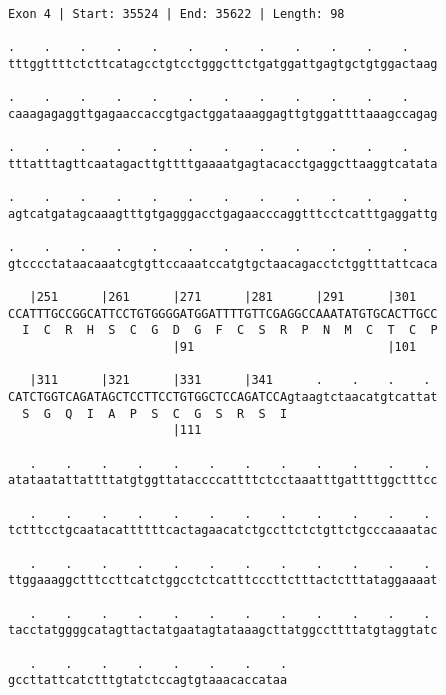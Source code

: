 \documentclass{article}
\begin{document}
\begin{Verbatim}
Exon 4 | Start: 35524 | End: 35622 | Length: 98
 
.    .    .    .    .    .    .    .    .    .    .    .    
tttggttttctcttcatagcctgtcctgggcttctgatggattgagtgctgtggactaag
  
.    .    .    .    .    .    .    .    .    .    .    .    
caaagagaggttgagaaccaccgtgactggataaaggagttgtggattttaaagccagag
  
.    .    .    .    .    .    .    .    .    .    .    .    
tttatttagttcaatagacttgttttgaaaatgagtacacctgaggcttaaggtcatata
  
.    .    .    .    .    .    .    .    .    .    .    .    
agtcatgatagcaaagtttgtgagggacctgagaacccaggtttcctcatttgaggattg
  
.    .    .    .    .    .    .    .    .    .    .    .    
gtcccctataacaaatcgtgttccaaatccatgtgctaacagacctctggtttattcaca
  
   |251      |261      |271      |281      |291      |301   
CCATTTGCCGGCATTCCTGTGGGGATGGATTTTGTTCGAGGCCAAATATGTGCACTTGCC
  I  C  R  H  S  C  G  D  G  F  C  S  R  P  N  M  C  T  C  P
                       |91                           |101   
  
   |311      |321      |331      |341      .    .    .    . 
CATCTGGTCAGATAGCTCCTTCCTGTGGCTCCAGATCCAgtaagtctaacatgtcattat
  S  G  Q  I  A  P  S  C  G  S  R  S  I                     
                       |111                                 
  
   .    .    .    .    .    .    .    .    .    .    .    . 
atataatattattttatgtggttataccccattttctcctaaatttgattttggctttcc
  
   .    .    .    .    .    .    .    .    .    .    .    . 
tctttcctgcaatacattttttcactagaacatctgccttctctgttctgcccaaaatac
  
   .    .    .    .    .    .    .    .    .    .    .    . 
ttggaaaggctttccttcatctggcctctcatttcccttctttactctttataggaaaat
  
   .    .    .    .    .    .    .    .    .    .    .    . 
tacctatggggcatagttactatgaatagtataaagcttatggccttttatgtaggtatc
  
   .    .    .    .    .    .    .    .
gccttattcatctttgtatctccagtgtaaacaccataa
\end{Verbatim}
\newpage
\end{document}
